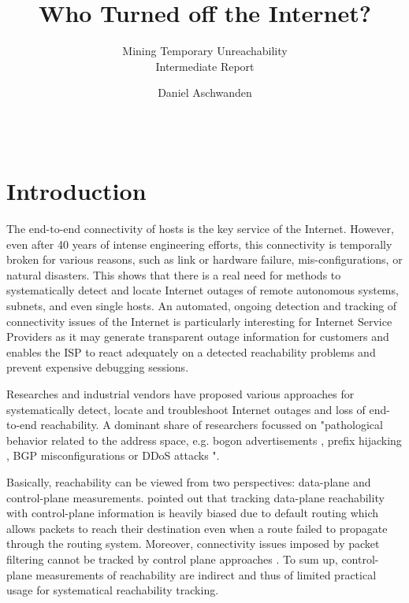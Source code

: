 \documentclass{sigcomm-alternate}
\begin{document}
 
\title{Who Turned off the Internet?} 
\subtitle{Mining Temporary Unreachability\\ \Large Intermediate Report }

\author{ \alignauthor Daniel Aschwanden\\
\\
\\
}

\maketitle 
\section{Introduction}
The end-to-end connectivity of hosts is the key service of the Internet. However, even after 40 years of intense engineering efforts, this connectivity is temporally broken for various reasons, such as link or hardware failure, mis-configurations, or natural disasters. 
This shows that there is a real need for methods to systematically detect and locate Internet outages of remote autonomous systems, subnets, and even single hosts. An automated, ongoing detection and tracking of connectivity issues of the Internet is particularly interesting for Internet Service Providers as it may generate transparent outage information for customers and enables the ISP to react adequately on a detected reachability problems and prevent expensive debugging sessions.

Researches and industrial vendors have proposed various approaches for systematically detect, locate and troubleshoot Internet outages and loss of end-to-end reachability. %
A dominant share of researchers focussed on "pathological behavior related to the address space, e.g. bogon advertisements \cite{Feamster:2005}, prefix hijacking \cite{Zhang:2010}, BGP misconfigurations \cite{Mahajan:2002} or DDoS attacks \cite{Chen:2001}"\cite{Bush:Optometry}.

Basically, reachability can be viewed from two perspectives: data-plane and control-plane measurements. \cite{Bush:Optometry} pointed out that tracking data-plane reachability with control-plane information is heavily biased due to default routing which allows packets to reach their destination even when a route failed to propagate through the routing system. Moreover, connectivity issues imposed by packet filtering cannot be tracked by control plane approaches \cite{Dainotti:2011:ACI}. To sum up, control-plane measurements of reachability are indirect and thus of limited practical usage for systematical reachability tracking.
\end{document}
